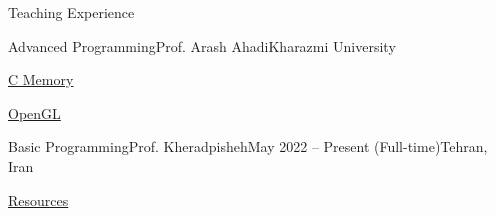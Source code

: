 \documentclass[]{main}
\begin{document}
\begin{section}{Teaching Experience}
 \begin{subsection}{Advanced Programming}{Prof. Arash Ahadi}{Kharazmi University}{}
     \item \href{https://github.com/ckoliber/ooc_lecture}{C Memory}
     \item \href{https://github.com/ckoliber/opengl}{OpenGL}
 \end{subsection}

 \begin{subsection}{Basic Programming}{Prof. Kheradpisheh}{May 2022 -- Present (Full-time)}{Tehran, Iran}
     \item \href{https://github.com/ckoliber/Phy97Sources}{Resources}
 \end{subsection}
\end{section}
\end{document}
